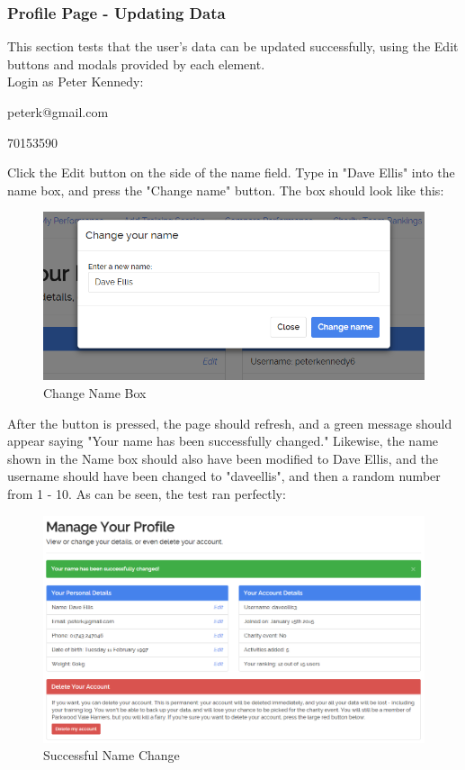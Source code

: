 \documentclass{article}[12pt,a4paper]
\begin{document}
{\clearpage

\subsubsection{Profile Page - Updating Data}
This section tests that the user's data can be updated successfully, using the Edit buttons and modals provided by each element.\\

Login as Peter Kennedy:

\begin{description}[labelindent=1cm]
  \item[Email:] peterk@gmail.com
  \item[Password:] 70153590
\end{description}

Click the Edit button on the side of the name field. Type in "Dave Ellis" into the name box, and press the "Change name" button. The box should look like this:

\begin{figure}[h!]
    \includegraphics[scale=0.33]{images/testing/profile/change_name}
    \caption{Change Name Box}
\end{figure}

After the button is pressed, the page should refresh, and a green message should appear saying "Your name has been successfully changed." Likewise, the name shown in the Name box should also have been modified to Dave Ellis, and the username should have been changed to "daveellis", and then a random number from 1 - 10. As can be seen, the test ran perfectly:

\begin{figure}[h!]
    \includegraphics[scale=0.31]{images/testing/profile/change_name_success}
    \caption{Successful Name Change}
\end{figure}

}
\end{document}
